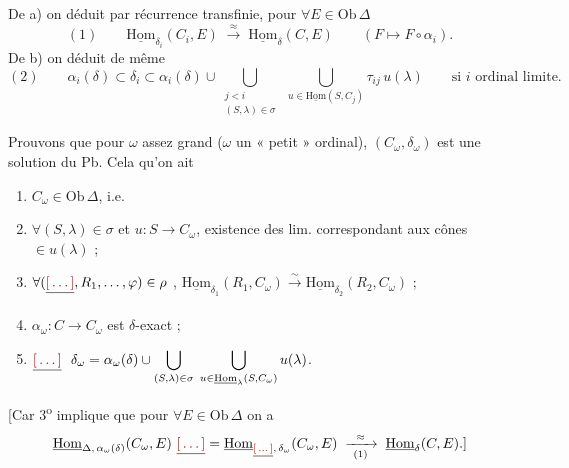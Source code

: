 \documentclass[11pt,a4paper]{article}
\begin{document}

De a) on déduit par récurrence transfinie, pour $\forall E \in
\mathrm{Ob}\,\Delta$
\[
  (1)\qquad
  \underline{\mathrm{Hom}}_{\delta_{i}}(C_{i}, E)
  \;\xrightarrow{\ \approx\ }\;
  \underline{\mathrm{Hom}}_{\delta}(C, E)
  \qquad (F \mapsto F \circ \alpha_{i}) .
\]
De b) on déduit de même
\[
  (2)\qquad
  \alpha_{i}(\delta) \subset \delta_{i} \subset
  \alpha_{i}(\delta) \cup
  \bigcup_{\substack{j < i \\ (S,\lambda) \in \sigma}} \;
  \bigcup_{u \in \underline{\mathrm{Hom}}(S, C_{j})} \tau_{ij}\, u(\lambda)
  \qquad \text{si } i \text{ ordinal limite.}
\]

Prouvons que pour $\omega$  assez grand ($\omega$ un
« petit » ordinal), $(C_{\omega}, \delta_{\omega})$ est une solution du Pb.
Cela   qu'on ait

\begin{enumerate}
  \item[1\textsuperscript{o})] $C_{\omega} \in \mathrm{Ob}\,\Delta$, i.e.
  \item[A$_{1}$)] $\forall (S,\lambda) \in \sigma$ et $u : S \to C_{\omega}$,
      existence des lim. correspondant aux cônes $\in u(\lambda)$ ;
  \item[A$_{2}$)] $\forall (\struck{\ill{}}, R_{1}, \ldots, \varphi) \in
      \rho$ ,
      $\underline{\mathrm{Hom}}_{\delta_{1}}(R_{1}, C_{\omega})
      \xrightarrow{\ \sim\ }
      \underline{\mathrm{Hom}}_{\delta_{2}}(R_{2}, C_{\omega})$ ;
  \item[2\textsuperscript{o})] $\alpha_{\omega} : C \to C_{\omega}$ est
    $\delta$-exact ;
  \item[3\textsuperscript{o})] $\displaystyle \struck{\ill{}}\ \ \delta_{\omega}
    = \alpha_{\omega}(\delta) \cup \bigcup_{(S,\lambda) \in \sigma} \;
    \bigcup_{u \in \underline{\mathrm{Hom}}_{\lambda}(S, C_{\omega})}
    u(\lambda)$.
\end{enumerate}

[Car 3\textsuperscript{o} implique que pour $\forall E \in \mathrm{Ob}\,\Delta$
on a
\[
  \underline{\mathrm{Hom}}_{\Delta,\, \alpha_{\omega}(\delta)}(C_{\omega}, E)
  \ \struck{\ill{}} = 
  \underline{\mathrm{Hom}}_{\struck{\ill{}},\, \delta_{\omega}}(C_{\omega}, E)
  \;\xrightarrow[\ (1)\ ]{\ \approx\ }\;
  \underline{\mathrm{Hom}}_{\delta}(C, E) .]
\]
\end{document}
